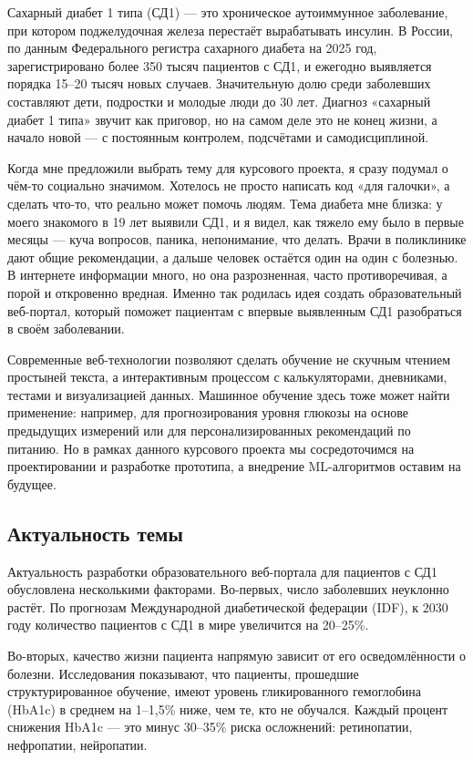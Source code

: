 \documentclass[14pt, a4paper]{extarticle}
\begin{document}
\noindent Сахарный диабет 1 типа (СД1) — это хроническое аутоиммунное заболевание, при котором поджелудочная железа перестаёт вырабатывать инсулин. В России, по данным Федерального регистра сахарного диабета на 2025 год, зарегистрировано более 350 тысяч пациентов с СД1, и ежегодно выявляется порядка 15–20 тысяч новых случаев. Значительную долю среди заболевших составляют дети, подростки и молодые люди до 30 лет. Диагноз «сахарный диабет 1 типа» звучит как приговор, но на самом деле это не конец жизни, а начало новой — с постоянным контролем, подсчётами и самодисциплиной.

\medskip
\noindent Когда мне предложили выбрать тему для курсового проекта, я сразу подумал о чём-то социально значимом. Хотелось не просто написать код «для галочки», а сделать что-то, что реально может помочь людям. Тема диабета мне близка: у моего знакомого в 19 лет выявили СД1, и я видел, как тяжело ему было в первые месяцы — куча вопросов, паника, непонимание, что делать. Врачи в поликлинике дают общие рекомендации, а дальше человек остаётся один на один с болезнью. В интернете информации много, но она разрозненная, часто противоречивая, а порой и откровенно вредная. Именно так родилась идея создать образовательный веб-портал, который поможет пациентам с впервые выявленным СД1 разобраться в своём заболевании.

\medskip
\noindent Современные веб-технологии позволяют сделать обучение не скучным чтением простыней текста, а интерактивным процессом с калькуляторами, дневниками, тестами и визуализацией данных. Машинное обучение здесь тоже может найти применение: например, для прогнозирования уровня глюкозы на основе предыдущих измерений или для персонализированных рекомендаций по питанию. Но в рамках данного курсового проекта мы сосредоточимся на проектировании и разработке прототипа, а внедрение ML-алгоритмов оставим на будущее.
\vskip 5cm
\subsection*{Актуальность темы}

\noindent Актуальность разработки образовательного веб-портала для пациентов с СД1 обусловлена несколькими факторами. Во-первых, число заболевших неуклонно растёт. По прогнозам Международной диабетической федерации (IDF), к 2030 году количество пациентов с СД1 в мире увеличится на 20–25\%. 

\medskip 
\noindent Во-вторых, качество жизни пациента напрямую зависит от его осведомлённости о болезни. Исследования показывают, что пациенты, прошедшие структурированное обучение, имеют уровень гликированного гемоглобина (HbA1c) в среднем на 1–1,5\% ниже, чем те, кто не обучался. Каждый процент снижения HbA1c — это минус 30–35\% риска осложнений: ретинопатии, нефропатии, нейропатии.
\end{document}
